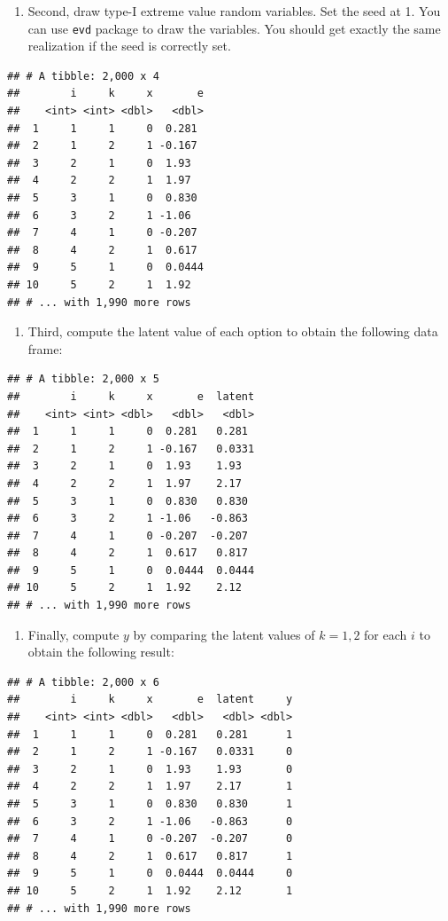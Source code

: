 \documentclass[]{book}
\providecommand{\tightlist}{%
  \setlength{\itemsep}{0pt}\setlength{\parskip}{0pt}}
\begin{document}
\begin{enumerate}
\def\labelenumi{\arabic{enumi}.}
\setcounter{enumi}{1}
\tightlist
\item
  Second, draw type-I extreme value random variables. Set the seed at 1.
  You can use \texttt{evd} package to draw the variables. You should get
  exactly the same realization if the seed is correctly set.
\end{enumerate}

\begin{verbatim}
## # A tibble: 2,000 x 4
##        i     k     x       e
##    <int> <int> <dbl>   <dbl>
##  1     1     1     0  0.281 
##  2     1     2     1 -0.167 
##  3     2     1     0  1.93  
##  4     2     2     1  1.97  
##  5     3     1     0  0.830 
##  6     3     2     1 -1.06  
##  7     4     1     0 -0.207 
##  8     4     2     1  0.617 
##  9     5     1     0  0.0444
## 10     5     2     1  1.92  
## # ... with 1,990 more rows
\end{verbatim}

\begin{enumerate}
\def\labelenumi{\arabic{enumi}.}
\setcounter{enumi}{2}
\tightlist
\item
  Third, compute the latent value of each option to obtain the following
  data frame:
\end{enumerate}

\begin{verbatim}
## # A tibble: 2,000 x 5
##        i     k     x       e  latent
##    <int> <int> <dbl>   <dbl>   <dbl>
##  1     1     1     0  0.281   0.281 
##  2     1     2     1 -0.167   0.0331
##  3     2     1     0  1.93    1.93  
##  4     2     2     1  1.97    2.17  
##  5     3     1     0  0.830   0.830 
##  6     3     2     1 -1.06   -0.863 
##  7     4     1     0 -0.207  -0.207 
##  8     4     2     1  0.617   0.817 
##  9     5     1     0  0.0444  0.0444
## 10     5     2     1  1.92    2.12  
## # ... with 1,990 more rows
\end{verbatim}

\begin{enumerate}
\def\labelenumi{\arabic{enumi}.}
\setcounter{enumi}{3}
\tightlist
\item
  Finally, compute \(y\) by comparing the latent values of \(k = 1, 2\)
  for each \(i\) to obtain the following result:
\end{enumerate}

\begin{verbatim}
## # A tibble: 2,000 x 6
##        i     k     x       e  latent     y
##    <int> <int> <dbl>   <dbl>   <dbl> <dbl>
##  1     1     1     0  0.281   0.281      1
##  2     1     2     1 -0.167   0.0331     0
##  3     2     1     0  1.93    1.93       0
##  4     2     2     1  1.97    2.17       1
##  5     3     1     0  0.830   0.830      1
##  6     3     2     1 -1.06   -0.863      0
##  7     4     1     0 -0.207  -0.207      0
##  8     4     2     1  0.617   0.817      1
##  9     5     1     0  0.0444  0.0444     0
## 10     5     2     1  1.92    2.12       1
## # ... with 1,990 more rows
\end{verbatim}
\end{document}
